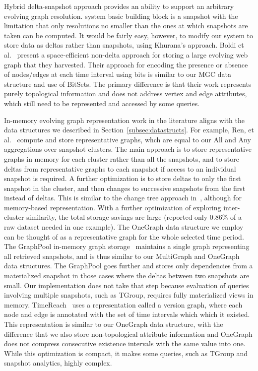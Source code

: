 Hybrid delta-snapshot approach provides an ability to support an
arbitrary evolving graph resolution.  \ql system basic building block
is a snapshot with the limitation that only resolutions no smaller
than the ones at which snapshots are taken can be computed.  It would
be fairly easy, however, to modify our system to store data as deltas
rather than snapshots, using Khurana's approach.    Boldi et
al.~\cite{Boldi2008} present a space-efficient non-delta approach for
storing a large evolving web graph that they harvested.  Their
approach for encoding the presence or absence of nodes/edges at each
time interval using bits is similar to our MGC data structure and use
of BitSets.  The primary difference is that their work represents
purely topological information and does not address vertex and edge
attributes, which still need to be represented and accessed by some
queries.  

In-memory evolving graph representation work in the literature aligns
with the data structures we described in
Section~\ref{subsec:datastructs}.  For example, Ren, et
al.~\cite{Ren2011} compute and store representative graphs, whch are
equal to our All and Any aggregations over snapshot clusters.  The
main approach is to store representative graphs in memory for each
cluster rather than all the snapshots, and to store deltas from
representative graphs to each snapshot if access to an individual
snapshot is required.  A further optimization is to store deltas to
only the first snapshot in the cluster, and then changes to successive
snapshots from the first instead of deltas.  This is similar to the
change tree approach in~\cite{Khurana2013}, although for memory-based
representation.  With a further optimization of exploring
inter-cluster similarity, the total storage savings are large
(reported only 0.86\% of a raw dataset needed in one example).  The
OneGraph data structure we employ can be thought of as a
representative graph for the whole selected time period.  The
GraphPool in-memory graph storage~\cite{Khurana2013} maintains a
single graph representing all retrieved snapshots, and is thus similar
to our MultiGraph and OneGraph data structures.  The GraphPool goes
further and stores only dependencies from a materialized snapshot in
those cases where the deltas between two snapshots are small.  Our
implementation does not take that step because evaluation of queries
involving multiple snapshots, such as TGroup, requires fully
materialized views in memory.  TimeReach~\cite{Semertzidis2015} uses a
representation called a version graph, where each node and edge is
annotated with the set of time intervals which which it existed.  This
representation is similar to our OneGraph data structure, with the
difference that we also store non-topological attribute information
and OneGraph does not compress consecutive existence intervals with
the same value into one.  While this optimization is compact, it makes
some queries, such as TGroup and snapshot analytics, highly complex.

